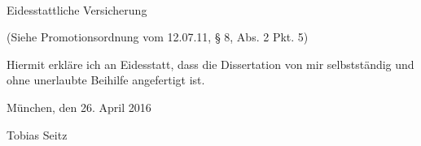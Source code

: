 






~\vfill

\begin{Large}Eidesstattliche Versicherung\end{Large}

\begin{small}(Siehe Promotionsordnung vom 12.07.11, § 8, Abs. 2 Pkt. 5)\end{small}


Hiermit erkl\"{a}re ich an Eidesstatt, dass die Dissertation von mir selbstst\"{a}ndig und ohne unerlaubte Beihilfe angefertigt ist.

München, den 26. April 2016


\vspace{2cm}


\hfill Tobias Seitz
~\vfill


